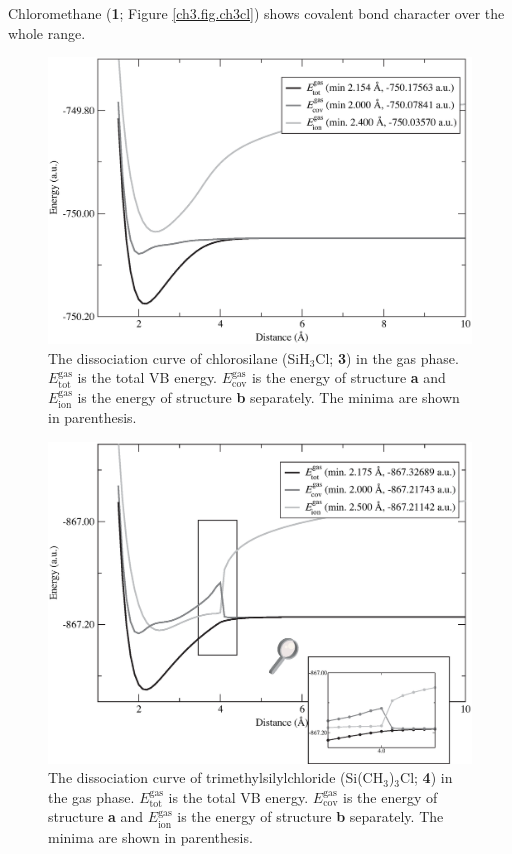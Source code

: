Chloromethane (\textbf{1}; Figure \ref{ch3.fig.ch3cl}) shows covalent bond character over the whole range.
\begin{figure}[t]
\begin{center}
\includegraphics[scale=0.55]{dissociation/figures/sih3cl_g.eps}
\end{center}
\caption{The dissociation curve of chlorosilane (SiH$_3$Cl; \textbf{3}) in the gas phase. $E_\mathrm{tot}^\mathrm{gas}$ is the total VB energy. $E_\mathrm{cov}^\mathrm{gas}$ is the energy of structure \textbf{a} and $E_\mathrm{ion}^\mathrm{gas}$ is the energy of structure \textbf{b} separately. The minima are shown in parenthesis.}
\label{ch3.fig.sih3cl}
\end{figure}
\begin{figure}[t]
\begin{center}
\includegraphics[scale=0.55]{dissociation/figures/c3h9sicl_g.eps}
\end{center}
\caption{The dissociation curve of trimethylsilylchloride (Si(CH$_3$)$_3$Cl; \textbf{4}) in the gas phase. $E_\mathrm{tot}^\mathrm{gas}$ is the total VB energy. $E_\mathrm{cov}^\mathrm{gas}$ is the energy of structure \textbf{a} and $E_\mathrm{ion}^\mathrm{gas}$ is the energy of structure \textbf{b} separately. The minima are shown in parenthesis.}
\label{ch3.fig.c3h9sicl}
\end{figure}
